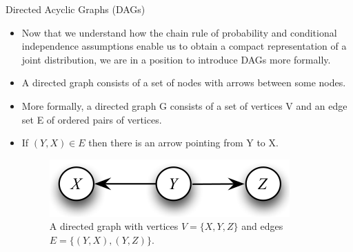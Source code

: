 \documentclass[handout]{beamer}
\begin{document}
\begin{frame}{Directed Acyclic Graphs (DAGs)}
\scriptsize{
\begin{itemize}

\item Now that we understand how the chain rule of probability and conditional independence assumptions enable us to obtain a compact representation of a joint distribution, we are in a position to introduce DAGs more formally.

\item A directed graph consists of a set of nodes with arrows between some nodes.



\item More formally, a directed graph G consists of a set of vertices V and an edge set E of ordered pairs of
vertices.


\item If $(Y, X) \in E$  then there is an arrow pointing from Y to X. 

\begin{figure}[h!]
	\centering
	\includegraphics[scale=0.5]{pics/dag1.png}
	\caption{A directed graph with vertices $V = \{X, Y, Z\}$ and edges $E = \{(Y, X), (Y, Z)\}$.}
	\end{figure} 


 
\end{itemize}



} 

\end{frame}
\end{document}
